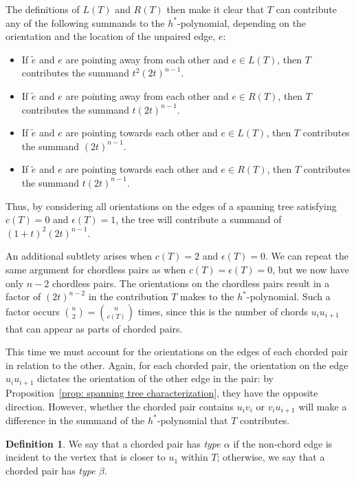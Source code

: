 \documentclass{amsart}
\numberwithin{equation}{section}
\theoremstyle{plain}
\theoremstyle{definition}
\newtheorem{defn}[thm]{Definition}
\newcommand{\etilde}{\widetilde{e}}
\begin{document}
The definitions of $L(T)$ and $R(T)$ then make it clear that $T$ can contribute any of the following summands to the $h^*$-polynomial, depending on the orientation and the location of the unpaired edge, $e$:
\begin{itemize}
    \item If $\etilde$ and $e$ are pointing away from each other and $e \in L(T)$, then $T$ contributes the summand $t^2(2t)^{n-1}$.
    \item If $\etilde$ and $e$ are pointing away from each other and $e \in R(T)$, then $T$ contributes the summand $t(2t)^{n-1}$.
    \item If $\etilde$ and $e$ are pointing towards each other and $e \in L(T)$, then $T$ contributes the summand $(2t)^{n-1}$.
    \item If $\etilde$ and $e$ are pointing towards each other and $e \in R(T)$, then $T$ contributes the summand $t(2t)^{n-1}$.
\end{itemize}
Thus, by considering all orientations on the edges of a spanning tree satisfying $c(T) = 0$ and $\epsilon(T) = 1$, the tree will contribute a summand of $(1+t)^2(2t)^{n-1}$.

An additional subtlety arises when $c(T) = 2$ and $\epsilon(T) = 0$.
We can repeat the same argument for chordless pairs as when $c(T) =\epsilon(T)=0$, but we now have only $n-2$ chordless pairs.
The orientations on the chordless pairs result in a factor of $(2t)^{n-2}$ in the contribution $T$ makes to the $h^*$-polynomial.
Such a factor occurs $\binom{n}{2} = \binom{n}{c(T)}$ times, since this is the number of chords $u_iu_{i+1}$ that can appear as parts of chorded pairs. 

This time we must account for the orientations on the edges of each chorded pair in relation to the other. 
Again, for each chorded pair, the orientation on the edge $u_iu_{i+1}$ dictates the orientation of the other edge in the pair: by Proposition~\ref{prop: spanning tree characterization}, they have the opposite direction. 
However, whether the chorded pair contains $u_iv_i$ or $v_iu_{i+1}$ will make a difference in the summand of the $h^*$-polynomial that $T$ contributes.

\begin{defn}
    We say that a chorded pair has \emph{type $\alpha$} if the non-chord edge is incident to the vertex that is closer to $u_1$ within $T$; otherwise, we say that a chorded pair has \emph{type $\beta$}.
\end{defn}
\end{document}
